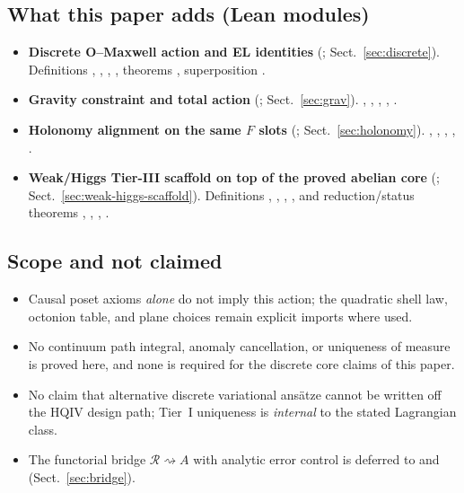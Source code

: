 \documentclass[11pt]{amsart}
\begin{document}
\subsection{What this paper adds (Lean modules)}
\label{subsec:adds}

\begin{itemize}
\item \textbf{Discrete O--Maxwell action and EL identities} (; Sect.~\ref{sec:discrete}). Definitions , , , , theorems , superposition .
\item \textbf{Gravity constraint and total action} (; Sect.~\ref{sec:grav}). , , , , .
\item \textbf{Holonomy alignment on the same \(F\) slots} (; Sect.~\ref{sec:holonomy}). , , , , .
\item \textbf{Weak/Higgs Tier-III scaffold on top of the proved abelian core} (; Sect.~\ref{sec:weak-higgs-scaffold}). Definitions , , , , and reduction/status theorems , , , .
\end{itemize}

\subsection{Scope and not claimed}
\label{subsec:not-claimed}

\begin{itemize}
\item Causal poset axioms \emph{alone} do not imply this action; the quadratic shell law, octonion table, and plane choices remain explicit imports where used.
\item No continuum path integral, anomaly cancellation, or uniqueness of measure is proved here, and none is required for the discrete core claims of this paper.
\item No claim that alternative discrete variational ans\"atze cannot be written off the HQIV design path; Tier~I uniqueness is \emph{internal} to the stated Lagrangian class.
\item The functorial bridge \(\mathcal{R}\rightsquigarrow A\) with analytic error control is deferred to  and  (Sect.~\ref{sec:bridge}).
\end{itemize}
\end{document}
